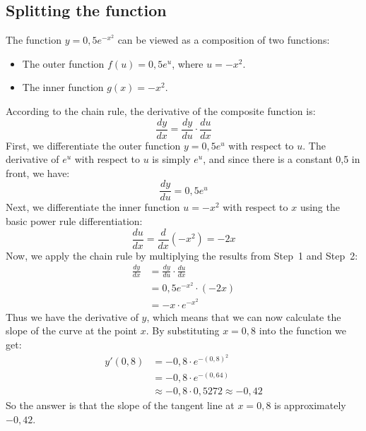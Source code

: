 \documentclass[a4paper,12pt]{article}
\begin{document}
\subsection{Splitting the function}
The function $y=0,5e^{-x^2}$ can be viewed as a composition of two functions:
\begin{itemize}
    \item The outer function $f(u)=0,5e^u$, where $u=-x^2$. %
    \item The inner function $g(x)=-x^2$.
\end{itemize}
According to the chain rule, the derivative of the composite function is:
\begin{displaymath}
    \frac{dy}{dx} = \frac{dy}{du} \cdot \frac{du}{dx} %
\end{displaymath}
First, we differentiate the outer function $y = 0,5e^u$ with respect to $u$. 
The derivative of $e^u$ with respect to $u$ is simply $e^u$, and since there 
is a constant 0,5 in front, we have:
\begin{equation}
    \frac{dy}{du} = 0,5e^u %
\end{equation}
Next, we differentiate the inner function $u = -x^2$ with respect to $x$ using 
the basic power rule differentiation:
\begin{equation}
    \frac{du}{dx} = \frac{d}{dx}\left(-x^2\right) = -2x %
\end{equation}
Now, we apply the chain rule by multiplying the results from Step~1 and Step~2:
\begin{equation}
    \begin{split}
        \frac{dy}{dx}   &= \frac{dy}{du} \cdot \frac{du}{dx}    \\%
                        &= 0,5e^{-x^2} \cdot \left(-2x\right)   \\
                        &= -x \cdot e^{-x^2}
    \end{split}
\end{equation}
Thus we have the derivative of $y$, which means that we can now calculate 
the slope of the curve at the point $x$. By substituting $x = 0,8$ into the
function we get:
\begin{equation}
    \begin{split} %
        y'(0,8) & = -0,8 \cdot e^{-\left(0,8\right)^2} \\ %
                & = -0,8 \cdot e^{-\left(0,64\right)} \\ %
                & \approx -0,8 \cdot 0,5272 \approx -0,42
    \end{split}
\end{equation}
So the answer is that the slope of the tangent line at $x = 0,8$ is 
approximately $-0,42$.
%
\end{document}
